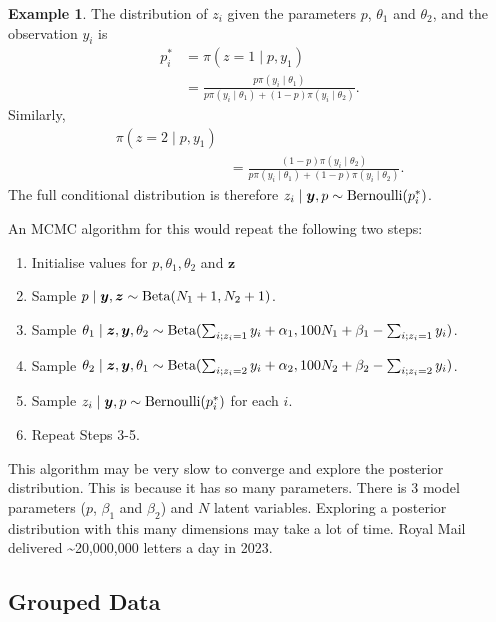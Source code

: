 \documentclass[
]{book}
\providecommand{\tightlist}{%
  \setlength{\itemsep}{0pt}\setlength{\parskip}{0pt}}
\theoremstyle{definition}
\theoremstyle{definition}
\newtheorem{example}{Example}[chapter]
\theoremstyle{definition}
\theoremstyle{definition}
\theoremstyle{remark}
\begin{document}
\begin{example}
The distribution of \(z_i\) given the parameters \(p\), \(\theta_1\) and \(\theta_2\), and the observation \(y_i\) is
\begin{align*}
p^*_i & = \pi(z = 1 \mid p, y_1) \\
&= \frac{p\pi(y_i \mid \theta_1)}{p\pi(y_i \mid \theta_1) + (1-p)\pi(y_i \mid \theta_2)}.
\end{align*}
Similarly,
\begin{align*}
\pi(z = 2 \mid p, y_1) \\
&= \frac{(1-p)\pi(y_i \mid \theta_2)}{p\pi(y_i \mid \theta_1) + (1-p)\pi(y_i \mid \theta_2)}.
\end{align*}
The full conditional distribution is therefore \(z_i \mid \boldsymbol{y}, p \sim \hbox{Bernoulli}(p^*_i)\).

An MCMC algorithm for this would repeat the following two steps:

\begin{enumerate}
\def\labelenumi{\arabic{enumi}.}
\tightlist
\item
  Initialise values for \(p, \theta_1, \theta_2\) and \(\boldsymbol{z}\)
\item
  Sample \(p \mid \boldsymbol{y}, \boldsymbol{z} \sim \hbox{Beta}(N_1 + 1, N_2 + 1)\).
\item
  Sample \(\theta_1 \mid \boldsymbol{z}, \boldsymbol{y}, \theta_2 \sim\hbox{Beta}(\sum_{i; z_i = 1}y_i + \alpha_1 , 100N_1 + \beta_1 - \sum_{i; z_i = 1}y_i)\).
\item
  Sample \(\theta_2 \mid \boldsymbol{z}, \boldsymbol{y}, \theta_1 \sim \hbox{Beta}(\sum_{i; z_i = 2}y_i + \alpha_2 , 100N_2 + \beta_2 - \sum_{i; z_i = 2}y_i)\).
\item
  Sample \(z_i \mid \boldsymbol{y}, p \sim \hbox{Bernoulli}(p^*_i)\) for each \(i\).
\item
  Repeat Steps 3-5.
\end{enumerate}

This algorithm may be very slow to converge and explore the posterior distribution. This is because it has so many parameters. There is 3 model parameters (\(p\), \(\beta_1\) and \(\beta_2\)) and \(N\) latent variables. Exploring a posterior distribution with this many dimensions may take a lot of time. Royal Mail delivered \textasciitilde20,000,000 letters a day in 2023.
\end{example}

\subsection{Grouped Data}\label{grouped-data}
\end{document}
